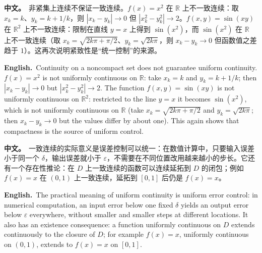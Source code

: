 \documentclass[UTF8,11pt,a4paper]{ctexart}
\newcommand{\BOTH}[2]{\par\noindent\textbf{中文。}\ #1\par\noindent\textbf{English.}\ #2\par}
\begin{document}
\BOTH{非紧集上连续不保证一致连续。$f(x)=x^2$ 在 $\mathbb R$ 上不一致连续：取 $x_k=k$、$y_k=k+1/k$，则 $|x_k-y_k|\to0$ 但 $|x_k^2-y_k^2|\to2$。$f(x,y)=\sin(xy)$ 在 $\mathbb R^2$ 上不一致连续：限制在直线 $y=x$ 上得到 $\sin(x^2)$，而 $\sin(x^2)$ 在 $\mathbb R$ 上不一致连续（取 $x_k=\sqrt{2k\pi+\pi/2}$、$y_k=\sqrt{2k\pi}$，则 $x_k-y_k\to0$ 但函数值之差趋于 $1$）。这再次说明紧致性是“统一控制”的来源。}{Continuity on a noncompact set does not guarantee uniform continuity. $f(x)=x^2$ is not uniformly continuous on $\mathbb R$: take $x_k=k$ and $y_k=k+1/k$; then $|x_k-y_k|\to0$ but $|x_k^2-y_k^2|\to2$. The function $f(x,y)=\sin(xy)$ is not uniformly continuous on $\mathbb R^2$: restricted to the line $y=x$ it becomes $\sin(x^2)$, which is not uniformly continuous on $\mathbb R$ (take $x_k=\sqrt{2k\pi+\pi/2}$ and $y_k=\sqrt{2k\pi}$; then $x_k-y_k\to0$ but the values differ by about one). This again shows that compactness is the source of uniform control.}
\BOTH{一致连续的实际意义是误差控制可以统一：在数值计算中，只要输入误差小于同一个 $\delta$，输出误差就小于 $\varepsilon$，不需要在不同位置改用越来越小的步长。它还有一个存在性推论：在 $D$ 上一致连续的函数可以连续延拓到 $D$ 的闭包；例如 $f(x)=x$ 在 $(0,1)$ 上一致连续，延拓到 $[0,1]$ 后仍是 $f(x)=x$。}{The practical meaning of uniform continuity is uniform error control: in numerical computation, an input error below one fixed $\delta$ yields an output error below $\varepsilon$ everywhere, without smaller and smaller steps at different locations. It also has an existence consequence: a function uniformly continuous on $D$ extends continuously to the closure of $D$; for example $f(x)=x$, uniformly continuous on $(0,1)$, extends to $f(x)=x$ on $[0,1]$.}
\end{document}
